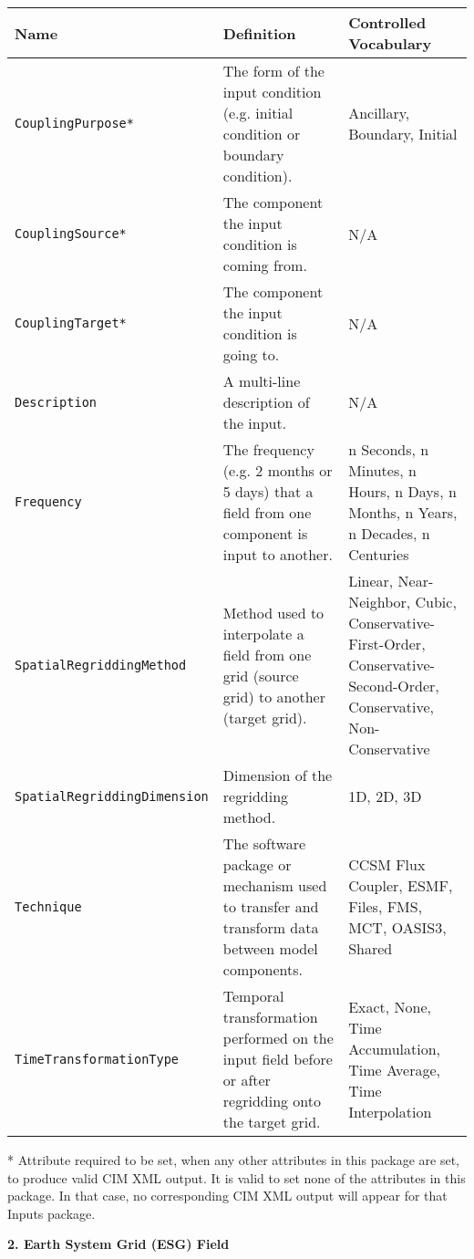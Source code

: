 \begin{tabular}{|p{6cm}|p{5cm}|p{3cm}|}
    \hline\hline
    {\bf Name} & {\bf Definition} & {\bf Controlled Vocabulary} \\
    \hline\hline
    {\tt CouplingPurpose*} & The form of the input condition (e.g. initial condition or boundary condition). &  Ancillary, Boundary, Initial\\
    {\tt CouplingSource*} & The component the input condition is coming from. & N/A \\ 
    {\tt CouplingTarget*} & The component the input condition is going to. & N/A \\ 
    {\tt Description} &  A multi-line description of the input. & N/A \\ 
    {\tt Frequency} & The frequency (e.g. 2 months or 5 days) that a field from one component is input to another. & n Seconds, n Minutes, n Hours, n Days, n Months, n Years, n Decades, n Centuries\\ 
    {\tt SpatialRegriddingMethod} & Method used to interpolate a field from one grid (source grid) to another (target grid). & Linear, Near-Neighbor, Cubic, Conservative-First-Order, Conservative-Second-Order, Conservative, Non-Conservative\\ 
    {\tt SpatialRegriddingDimension} & Dimension of the regridding method. & 1D, 2D, 3D\\ 
    {\tt Technique} & The software package or mechanism used to transfer and transform data between model components. & CCSM Flux Coupler, ESMF, Files, FMS, MCT, OASIS3, Shared\\ 
    {\tt TimeTransformationType} & Temporal transformation performed on the input field before or after regridding onto the target grid.& Exact, None, Time Accumulation, Time Average, Time Interpolation\\ 
    \hline\hline
\end{tabular}
\linebreak
* Attribute required to be set, when any other attributes in this package are set, to produce valid CIM XML output. It is valid to set none of the attributes in this package. In that case, no corresponding CIM XML output will appear for that Inputs package. \\

\vspace{.20in}

{\bf 2. Earth System Grid (ESG) Field}

